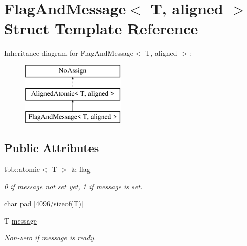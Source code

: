\hypertarget{structFlagAndMessage}{}\section{Flag\+And\+Message$<$ T, aligned $>$ Struct Template Reference}
\label{structFlagAndMessage}
Inheritance diagram for Flag\+And\+Message$<$ T, aligned $>$\+:\begin{figure}[H]
\begin{center}
\leavevmode
\includegraphics[height=3.000000cm]{structFlagAndMessage}
\end{center}
\end{figure}
\subsection*{Public Attributes}
\begin{DoxyCompactItemize}
\item 
\hypertarget{structFlagAndMessage_a7ffa847ce28cf68db2d53a48607cb439}{}\hyperlink{structtbb_1_1atomic}{tbb\+::atomic}$<$ T $>$ \& \hyperlink{structFlagAndMessage_a7ffa847ce28cf68db2d53a48607cb439}{flag}\label{structFlagAndMessage_a7ffa847ce28cf68db2d53a48607cb439}

\begin{DoxyCompactList}\small\item\em 0 if message not set yet, 1 if message is set. \end{DoxyCompactList}\item 
char \hyperlink{structFlagAndMessage_a962e3cc5305335a14a58e005f1ea8ed3}{pad} \mbox{[}4096/sizeof(T)\mbox{]}
\item 
\hypertarget{structFlagAndMessage_a7fbf908980f3355243405d8c3cafb602}{}T \hyperlink{structFlagAndMessage_a7fbf908980f3355243405d8c3cafb602}{message}\label{structFlagAndMessage_a7fbf908980f3355243405d8c3cafb602}

\begin{DoxyCompactList}\small\item\em Non-\/zero if message is ready. \end{DoxyCompactList}\end{DoxyCompactItemize}
